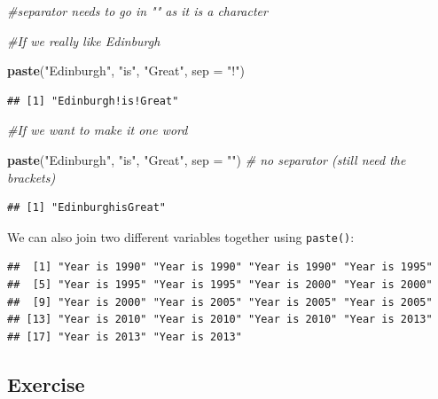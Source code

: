 \documentclass[]{book}
\makeatletter
\newenvironment{Shaded}{\begin{snugshade}}{\end{snugshade}}
\newcommand{\KeywordTok}[1]{\textcolor[rgb]{0.13,0.29,0.53}{\textbf{#1}}}
\newcommand{\DataTypeTok}[1]{\textcolor[rgb]{0.13,0.29,0.53}{#1}}
\newcommand{\StringTok}[1]{\textcolor[rgb]{0.31,0.60,0.02}{#1}}
\newcommand{\CommentTok}[1]{\textcolor[rgb]{0.56,0.35,0.01}{\textit{#1}}}
\newcommand{\OperatorTok}[1]{\textcolor[rgb]{0.81,0.36,0.00}{\textbf{#1}}}
\newcommand{\NormalTok}[1]{#1}
\newenvironment{kframe}{%
\medskip{}
\setlength{\fboxsep}{.8em}
 \def\at@end@of@kframe{}%
 \ifinner\ifhmode%
  \def\at@end@of@kframe{\end{minipage}}%
  \begin{minipage}{\columnwidth}%
 \fi\fi%
 \def\FrameCommand##1{\hskip\@totalleftmargin \hskip-\fboxsep
 \colorbox{shadecolor}{##1}\hskip-\fboxsep
     \hskip-\linewidth \hskip-\@totalleftmargin \hskip\columnwidth}%
 \MakeFramed {\advance\hsize-\width
   \@totalleftmargin\z@ \linewidth\hsize
   \@setminipage}}%
 {\par\unskip\endMakeFramed%
 \at@end@of@kframe}
\renewenvironment{Shaded}{\begin{kframe}}{\end{kframe}}
\makeatother
\begin{document}
\begin{Shaded}
\begin{Highlighting}[]
\CommentTok{#separator needs to go in "" as it is a character}

\CommentTok{#If we really like Edinburgh}

\KeywordTok{paste}\NormalTok{(}\StringTok{"Edinburgh"}\NormalTok{, }\StringTok{"is"}\NormalTok{, }\StringTok{"Great"}\NormalTok{, }\DataTypeTok{sep =} \StringTok{"!"}\NormalTok{)}
\end{Highlighting}
\end{Shaded}

\begin{verbatim}
## [1] "Edinburgh!is!Great"
\end{verbatim}

\begin{Shaded}
\begin{Highlighting}[]
\CommentTok{#If we want to make it one word}

\KeywordTok{paste}\NormalTok{(}\StringTok{"Edinburgh"}\NormalTok{, }\StringTok{"is"}\NormalTok{, }\StringTok{"Great"}\NormalTok{, }\DataTypeTok{sep =} \StringTok{""}\NormalTok{) }\CommentTok{# no separator (still need the brackets)}
\end{Highlighting}
\end{Shaded}

\begin{verbatim}
## [1] "EdinburghisGreat"
\end{verbatim}

We can also join two different variables together using
\texttt{paste()}:

\begin{Shaded}
\end{Shaded}

\begin{verbatim}
##  [1] "Year is 1990" "Year is 1990" "Year is 1990" "Year is 1995"
##  [5] "Year is 1995" "Year is 1995" "Year is 2000" "Year is 2000"
##  [9] "Year is 2000" "Year is 2005" "Year is 2005" "Year is 2005"
## [13] "Year is 2010" "Year is 2010" "Year is 2010" "Year is 2013"
## [17] "Year is 2013" "Year is 2013"
\end{verbatim}

\subsection{Exercise}\label{exercise-12}
\end{document}
